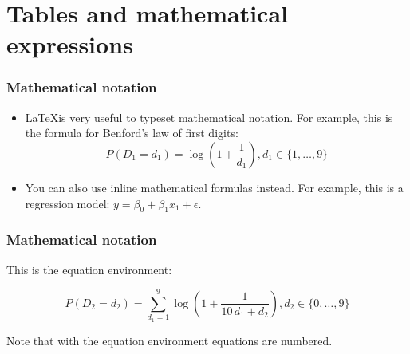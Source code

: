 \section{Tables and mathematical expressions}


\begin{frame}

\frametitle{Mathematical notation}

\begin{itemize}

\item \LaTeX is very useful to typeset mathematical notation. For example, this is the formula for Benford's law of first digits: $$ P(D_1=d_1) = \operatorname{log}\left(1+\frac{1}{d_1}\right), d_1\in \{ 1, \dots , 9\}$$

\item You can also use inline mathematical formulas instead. For example, this is a regression model: $y = \beta_0 + \beta_1 x_1 + \epsilon$.

\end{itemize}

\end{frame}

\begin{frame}
	\frametitle{Mathematical notation}

This is the equation environment:

\begin{equation}
P(D_2=d_2) = \sum_{d_1=1}^{9} \operatorname{log} \left(1+\frac{1}{10\, d_1 + d_2} \right), d_2\in \{ 0, \dots , 9\}
\end{equation}

Note that with the equation environment equations are numbered.

\end{frame}


